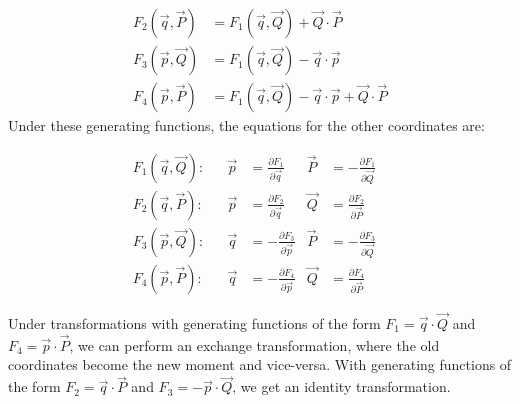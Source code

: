 \documentclass[10pt,landscape]{article}
\begin{document}
\begin{multicols}{3}
\begin{align}
	F_2(\vec{q}, \vec{P}) &= F_1(\vec{q},\vec{Q})+\vec{Q}\cdot\vec{P} \\
	F_3(\vec{p}, \vec{Q}) &= F_1(\vec{q},\vec{Q})-\vec{q}\cdot \vec{p} \\
	F_4(\vec{p}, \vec{P}) &= F_1(\vec{q},\vec{Q})-\vec{q}\cdot\vec{p}+\vec{Q}\cdot\vec{P}
\end{align}
Under these generating functions, the equations for the other coordinates are:

\begin{align}
	F_1(\vec{q}, \vec{Q}): &&
	\vec{p} &= \frac{\partial F_1}{\partial \vec{q}} & 
	\vec{P} &= -\frac{\partial F_1}{\partial \vec{Q}} & \\
	F_2(\vec{q}, \vec{P}): &&
	\vec{p} &= \frac{\partial F_2}{\partial \vec{q}} & 
	\vec{Q} &= \frac{\partial F_2}{\partial \vec{P}} & \\
	F_3(\vec{p}, \vec{Q}): &&
	\vec{q} &= -\frac{\partial F_3}{\partial \vec{p}} & 
	\vec{P} &= -\frac{\partial F_3}{\partial \vec{Q}} & \\
	F_4(\vec{p}, \vec{P}): &&
	\vec{q} &= -\frac{\partial F_4}{\partial \vec{p}} & 
	\vec{Q} &= \frac{\partial F_4}{\partial \vec{P}} &
\end{align}

Under transformations with generating functions of the form $F_1=\vec{q}\cdot\vec{Q}$ and $F_4=\vec{p}\cdot\vec{P}$, we can perform an exchange transformation, where the old coordinates become the new moment and vice-versa. With generating functions of the form $F_2=\vec{q}\cdot\vec{P}$ and $F_3=-\vec{p}\cdot\vec{Q}$, we get an identity transformation.

\end{multicols}
\end{document}
